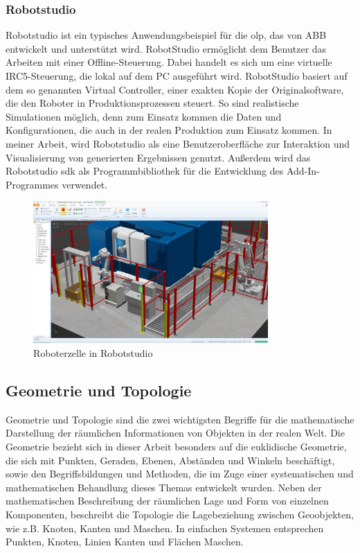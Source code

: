 \documentclass[14pt,a4paper,titlepage]{article}
\begin{document}
	\subsubsection{Robotstudio}
	Robotstudio ist ein typisches Anwendungsbeispiel für die \acs{olp}, das von ABB entwickelt und unterstützt wird. RobotStudio ermöglicht dem Benutzer das Arbeiten mit einer Offline-Steuerung. Dabei
	handelt es sich um eine virtuelle IRC5-Steuerung, die lokal auf dem PC ausgeführt
	wird. RobotStudio basiert auf dem so genannten Virtual Controller, einer exakten Kopie der Originalsoftware, die den Roboter in Produktionsprozessen steuert. So sind realistische Simulationen möglich, denn zum Einsatz kommen die Daten und Konfigurationen, die auch in der realen Produktion zum Einsatz kommen\cite{robotstudio}.
	In meiner Arbeit, wird Robotstudio als eine Benutzeroberfläche zur Interaktion und Visualisierung von generierten Ergebnissen genutzt. Außerdem wird das Robotstudio \acf{sdk} als Programmbibliothek für die Entwicklung des Add-In-Programmes verwendet.
	\begin{figure}[h!]
		\centering
		\includegraphics[width=0.8\textwidth]{robotstudio.jpg}
		\caption{Roboterzelle in Robotstudio}
		\label{fig2}
	\end{figure} 
	\pagebreak 
	\subsection{Geometrie und Topologie}
		Geometrie und Topologie sind die zwei wichtigsten Begriffe für die mathematische Darstellung der räumlichen Informationen von Objekten in der realen Welt. Die Geometrie bezieht sich in dieser Arbeit besonders auf die euklidische Geometrie, die sich mit Punkten, Geraden, Ebenen, Abständen und Winkeln beschäftigt, sowie den Begriffsbildungen und Methoden, die im Zuge einer systematischen und mathematischen Behandlung dieses Themas entwickelt wurden\cite{geometrie}. Neben der mathematischen Beschreibung der räumlichen Lage und Form von einzelnen Komponenten, beschreibt die Topologie die Lagebeziehung zwischen Geoobjekten, wie z.B. Knoten, Kanten und Maschen. In einfachen Systemen entsprechen Punkten, Knoten, Linien Kanten und Flächen Maschen\cite{topologie}.
		
\end{document}
